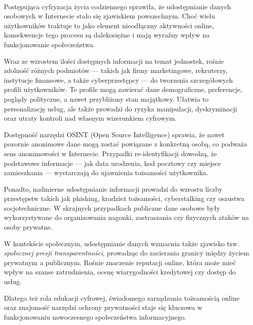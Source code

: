 \paragraph{}
Postępująca cyfryzacja życia codziennego sprawiła, że udostępnianie danych osobowych w Internecie stało się zjawiskiem powszechnym. Choć wielu użytkowników traktuje to jako element nieodłączny aktywności online, konsekwencje tego procesu są dalekosiężne i mają wyraźny wpływ na funkcjonowanie społeczeństwa.

Wraz ze wzrostem ilości dostępnych informacji na temat jednostek, rośnie zdolność różnych podmiotów — takich jak firmy marketingowe, rekruterzy, instytucje finansowe, a także cyberprzestępcy — do tworzenia szczegółowych profili użytkowników. Te profile mogą zawierać dane demograficzne, preferencje, poglądy polityczne, a nawet przybliżony stan majątkowy. Ułatwia to personalizację usług, ale także prowadzi do ryzyka manipulacji, dyskryminacji oraz utraty kontroli nad własnym wizerunkiem cyfrowym.

Dostępność narzędzi OSINT (Open Source Intelligence) sprawia, że nawet pozornie anonimowe dane mogą zostać powiązane z konkretną osobą, co podważa sens anonimowości w Internecie. Przypadki re-identyfikacji dowodzą, że podstawowe informacje — jak data urodzenia, kod pocztowy czy miejsce zamieszkania — wystarczają do ujawnienia tożsamości użytkownika.

Ponadto, nadmierne udostępnianie informacji prowadzi do wzrostu liczby przestępstw takich jak phishing, kradzież tożsamości, cyberstalking czy oszustwa socjotechniczne. W skrajnych przypadkach publiczne dane osobowe były wykorzystywane do organizowania nagonki, zastraszania czy fizycznych ataków na osoby prywatne.

W kontekście społecznym, udostępnianie danych wzmacnia także zjawisko tzw. \textit{społecznej presji transparentności}, prowadząc do zacierania granicy między życiem prywatnym a publicznym. Rośnie znaczenie reputacji online, która może mieć wpływ na szanse zatrudnienia, ocenę wiarygodności kredytowej czy dostęp do usług.

Dlatego też rola edukacji cyfrowej, świadomego zarządzania tożsamością online oraz znajomość narzędzi ochrony prywatności staje się kluczowa w funkcjonowaniu nowoczesnego społeczeństwa informacyjnego.



